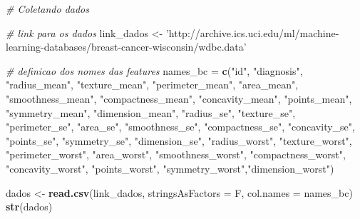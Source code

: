 \documentclass[]{article}
\newenvironment{Shaded}{\begin{snugshade}}{\end{snugshade}}
\newcommand{\KeywordTok}[1]{\textcolor[rgb]{0.13,0.29,0.53}{\textbf{#1}}}
\newcommand{\DataTypeTok}[1]{\textcolor[rgb]{0.13,0.29,0.53}{#1}}
\newcommand{\StringTok}[1]{\textcolor[rgb]{0.31,0.60,0.02}{#1}}
\newcommand{\CommentTok}[1]{\textcolor[rgb]{0.56,0.35,0.01}{\textit{#1}}}
\newcommand{\NormalTok}[1]{#1}
\begin{document}
\begin{Shaded}
\begin{Highlighting}[]
\CommentTok{# Coletando dados}

\CommentTok{# link para os dados}
\NormalTok{link_dados <-}\StringTok{ 'http://archive.ics.uci.edu/ml/machine-learning-databases/breast-cancer-wisconsin/wdbc.data'}

\CommentTok{# definicao dos nomes das features}
\NormalTok{names_bc =}\StringTok{ }\KeywordTok{c}\NormalTok{(}\StringTok{"id"}\NormalTok{, }\StringTok{"diagnosis"}\NormalTok{, }\StringTok{"radius_mean"}\NormalTok{, }\StringTok{"texture_mean"}\NormalTok{, }\StringTok{"perimeter_mean"}\NormalTok{, }\StringTok{"area_mean"}\NormalTok{, }\StringTok{"smoothness_mean"}\NormalTok{,}
          \StringTok{"compactness_mean"}\NormalTok{, }\StringTok{"concavity_mean"}\NormalTok{, }\StringTok{"points_mean"}\NormalTok{, }\StringTok{"symmetry_mean"}\NormalTok{, }\StringTok{"dimension_mean"}\NormalTok{, }\StringTok{"radius_se"}\NormalTok{,}
          \StringTok{"texture_se"}\NormalTok{, }\StringTok{"perimeter_se"}\NormalTok{, }\StringTok{"area_se"}\NormalTok{, }\StringTok{"smoothness_se"}\NormalTok{, }\StringTok{"compactness_se"}\NormalTok{, }\StringTok{"concavity_se"}\NormalTok{, }\StringTok{"points_se"}\NormalTok{,}
          \StringTok{"symmetry_se"}\NormalTok{, }\StringTok{"dimension_se"}\NormalTok{, }\StringTok{"radius_worst"}\NormalTok{, }\StringTok{"texture_worst"}\NormalTok{, }\StringTok{"perimeter_worst"}\NormalTok{, }\StringTok{"area_worst"}\NormalTok{,}
          \StringTok{"smoothness_worst"}\NormalTok{, }\StringTok{"compactness_worst"}\NormalTok{, }\StringTok{"concavity_worst"}\NormalTok{, }\StringTok{"points_worst"}\NormalTok{, }\StringTok{"symmetry_worst"}\NormalTok{,}\StringTok{"dimension_worst"}\NormalTok{)}

\NormalTok{dados <-}\StringTok{ }\KeywordTok{read.csv}\NormalTok{(link_dados, }\DataTypeTok{stringsAsFactors =}\NormalTok{ F, }\DataTypeTok{col.names =}\NormalTok{ names_bc)}
\KeywordTok{str}\NormalTok{(dados)}
\end{Highlighting}
\end{Shaded}
\end{document}
